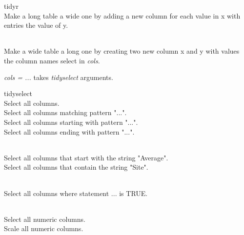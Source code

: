 
\vspace{2ex}

\begin{block}{tidyr}
     \\ Make a long table a wide one by adding a new column for each value in x with entries the value of y. \br

     \\ Make a wide table a long one by creating two new column x and y with values the column names select in \textit{cols}. \br

    \textit{cols = ...} takes \textit{tidyselect} arguments.\\
\end{block}

\vspace{2ex}

\begin{block}{tidyselect}
   \\ Select all columns. \br
   \\ Select all columns matching pattern "...". \br
   \\ Select all columns starting with pattern "...". \br
   \\ Select all columns ending with pattern "...".


   \\ Select all columns that start with the string "Average".\br
   \\ Select all columns that contain the string "Site".

   \\ Select all columns where statement ... is TRUE. \br

   \\ Select all numeric columns.\br
   \\ Scale all numeric columns.\br
\end{block}

\vspace{0.25ex}
